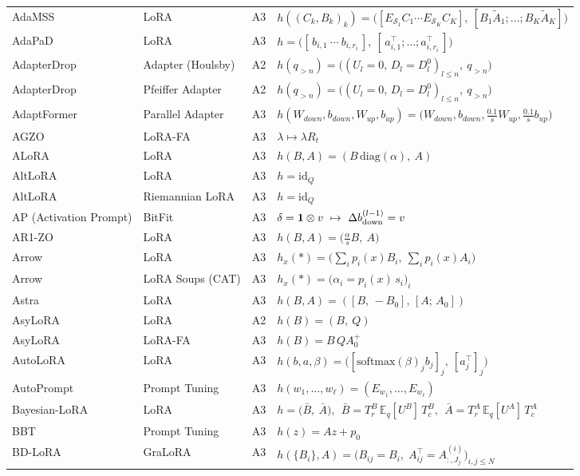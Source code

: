 \begin{longtable}{@{}>{\raggedright\arraybackslash}p{2.4cm}>{\raggedright\arraybackslash}p{2.4cm}c>{\raggedright\arraybackslash}p{8.6cm}@{}}
AdaMSS & LoRA & A3 & $h((C_k,B_k)_k)=\big([E_{\mathcal S_1}C_1\cdots E_{\mathcal S_K}C_K],\ [B_1\tilde A_1;\dots;B_K\tilde A_K]\big)$\\
AdaPaD & LoRA & A3 & $h=\big([\,b_{i,1}\ \cdots\ b_{i,r_i}\,],\ [\,a_{i,1}^\top;\dots;a_{i,r_i}^\top\,]\big)$\\
AdapterDrop & Adapter (Houlsby) & A2 & $h(q_{>n})=\big((U_l{=}0,\,D_l{=}D_l^0)_{l\le n},\ q_{>n}\big)$\\
AdapterDrop & Pfeiffer Adapter & A2 & $h(q_{>n})=\big((U_l{=}0,\,D_l{=}D_l^0)_{l\le n},\ q_{>n}\big)$\\
AdaptFormer & Parallel Adapter & A3 & $h(W_{down},b_{down},W_{up},b_{up})=\big(W_{down},b_{down},\tfrac{0.1}{s}W_{up},\tfrac{0.1}{s}b_{up}\big)$\\
AGZO & LoRA-FA & A3 & $\lambda\mapsto\lambda R_t$\\
ALoRA & LoRA & A3 & $h(B,A)=(B\,\mathrm{diag}(\alpha),\ A)$\\
AltLoRA & LoRA & A3 & $h=\mathrm{id}_Q$\\
AltLoRA & Riemannian LoRA & A3 & $h=\mathrm{id}_Q$\\
AP (Activation Prompt) & BitFit & A3 & $\delta=\mathbf 1\otimes v\ \mapsto\ \Delta b_{\rm down}^{(l-1)}=v$\\
AR1-ZO & LoRA & A3 & $h(B,A)=\big(\tfrac{\alpha}{s}B,\ A\big)$\\
Arrow & LoRA & A3 & $h_x(\ast)=\big(\textstyle\sum_ip_i(x)B_i,\ \sum_ip_i(x)A_i\big)$\\
Arrow & LoRA Soups (CAT) & A3 & $h_x(\ast)=\big(\alpha_i=p_i(x)\,s_i\big)_i$\\
Astra & LoRA & A3 & $h(B,A)=([B,\,-B_0],\,[A;\,A_0])$\\
AsyLoRA & LoRA & A2 & $h(B)=(B,\ Q)$\\
AsyLoRA & LoRA-FA & A3 & $h(B)=B\,QA_0^{+}$\\
AutoLoRA & LoRA & A3 & $h(b,a,\beta)=\big([\mathrm{softmax}(\beta)_jb_j]_j,\ [a_j^\top]_j\big)$\\
AutoPrompt & Prompt Tuning & A3 & $h(w_1,\dots,w_\ell)=(E_{w_1},\dots,E_{w_\ell})$\\
Bayesian-LoRA & LoRA & A3 & $h=\big(\bar B,\ \bar A\big),\ \ \bar B=T_r^B\,\mathbb E_q[U^B]\,T_c^B,\ \ \bar A=T_r^A\,\mathbb E_q[U^A]\,T_c^A$\\
BBT & Prompt Tuning & A3 & $h(z)=Az+p_0$\\
BD-LoRA & GraLoRA & A3 & $h(\{B_i\},A)=\big(B_{ij}=B_i,\;A_{ij}^\top=A^{(i)}_{:,J_j}\big)_{i,j\le N}$\\

\end{longtable}
